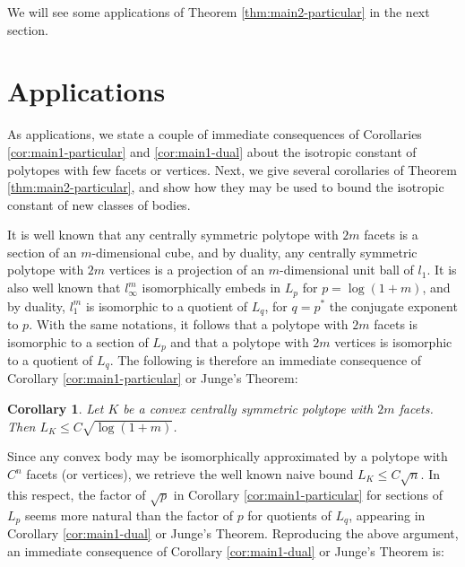 \documentclass[12pt,oneside]{amsart}
\newtheorem{cor}[thm]{Corollary}
\theoremstyle{definition}
\theoremstyle{remark}
\theoremstyle{proof}
\numberwithin{equation}{section}
\begin{document}
We will see some applications of Theorem
\ref{thm:main2-particular} in the next section.




\section{Applications} \label{sec:applications}

As applications, we state a couple of immediate consequences of
Corollaries \ref{cor:main1-particular} and \ref{cor:main1-dual}
about the isotropic constant of polytopes with few facets or
vertices. Next, we give several corollaries of Theorem
\ref{thm:main2-particular}, and show how they may be used to
bound the isotropic constant of new classes of bodies.

It is well known that any centrally symmetric polytope with $2m$
facets is a section of an $m$-dimensional cube, and by duality,
any centrally symmetric polytope with $2m$ vertices is a
projection of an $m$-dimensional unit ball of $l_1$. It is also
well known that $l_\infty^m$ isomorphically embeds in $L_p$ for
$p=\log(1+m)$, and by duality, $l_1^m$ is isomorphic to a quotient
of $L_q$, for $q=p^*$ the conjugate exponent to $p$. With the same
notations, it follows that a polytope with $2m$ facets is
isomorphic to a section of $L_{p}$ and that a polytope with $2m$
vertices is isomorphic to a quotient of $L_q$. The following is
therefore an immediate consequence of Corollary
\ref{cor:main1-particular} or Junge's Theorem:

\begin{cor}
Let $K$ be a convex centrally symmetric polytope with $2m$
facets. Then $L_K \leq C \sqrt{\log(1+m)}$.
\end{cor}

\noindent Since any convex body may be isomorphically approximated
by a polytope with $C^n$ facets (or vertices), we retrieve the
well known naive bound $L_K \leq C \sqrt{n}$. In this respect, the
factor of $\sqrt{p}$ in Corollary \ref{cor:main1-particular} for
sections of $L_p$ seems more natural than the factor of $p$ for
quotients of $L_q$, appearing in Corollary \ref{cor:main1-dual} or
Junge's Theorem. Reproducing the above argument, an immediate
consequence of Corollary \ref{cor:main1-dual} or Junge's Theorem
is:
\end{document}
